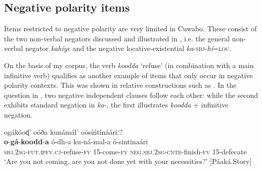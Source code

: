 \documentclass[output=paper,colorlinks=true, citecolor=brown,draftmode]{langscibook}
\begin{document}
\z 

\subsection{Negative polarity items}\label{sec:cuw:4.2}
Items restricted to negative polarity are very limited in Cuwabo. These consist of the two non-verbal negators discussed and illustrated in , i.e. the general non-verbal negator \textit{kahíye} and the negative locative-existential \textit{ka}{}-\textsc{sbj}{}-\textit{hí}=\textsc{loc.} 

On the basis of my corpus, the verb \textit{koodda} ‘refuse’ (in combination with a main infinitive verb) qualifies as another example of items that only occur in negative polarity contexts. This was shown in relative constructions such as . In the question in , two negative independent clauses follow each other: while the second exhibits standard negation in \textit{ka}{}-, the first illustrates \textit{koodda} + infinitive negation. 

\ea\label{ex:cuw:69} ogákóoɖ’ oóða kunámál’ oōsíńtínááríː?\\  
    \gll  \textbf{o}{}-\textbf{gá}{}-\textbf{koodd}{}-\textbf{a} ó-dh-a ku-ná-mal-a ó-sintinaári  \\
          \textsc{sbj.2sg}{}-\textsc{fut.ipfv.cj}{}-refuse-\textsc{fv} \textsc{15}{}-come-\textsc{fv} \textsc{neg.sbj.2}\textsc{sg}{}-\textsc{cnte-}finish-\textsc{fv} \textsc{15}{}-defecate  \\
    \glt  ‘Are you not coming, are you not done yet with your necessities?’ [Páaká.Story]

\z 
\end{document}
